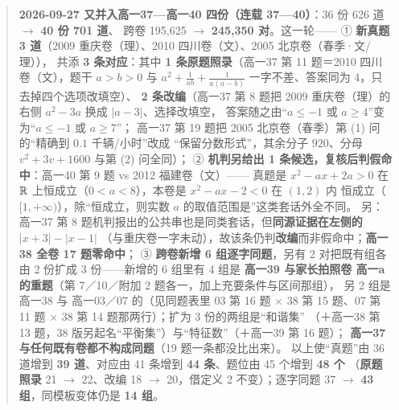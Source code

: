 \documentclass[a4paper,11pt]{article}
\begin{document}
\begin{quote}
\textbf{2026-09-27 又并入高一37---高一40 四份（连载 37---40）}：36 份 626 道 $\to$ \textbf{40 份 701 道}、
跨卷 195,625 $\to$ \textbf{245,350 对}。这一轮------
① \textbf{新真题 3 道}（2009 重庆卷（理）、2010 四川卷（文）、2005 北京卷（春季·文/理）），
共添 \textbf{3 条对应}：其中 \textbf{1 条原题照录}（高一37 第 11 题＝2010 四川卷（文），题干
\(a>b>0\) 与 \(a^2+\frac1{ab}+\frac1{a(a-b)}\) 一字不差、答案同为 \(4\)，只去掉四个选项改填空）、
\textbf{2 条改编}（高一37 第 8 题把 2009 重庆卷（理）的右侧 \(a^2-3a\) 换成 \(\lvert a-3\rvert\)、选择改填空，
答案随之由``\(a\leqslant-1\) 或 \(a\geqslant4\)''变为``\(a\leqslant-1\) 或 \(a\geqslant7\)''；
高一37 第 19 题把 2005 北京卷（春季）第 (1) 问的``精确到 \(0.1\) 千辆/小时''改成
``保留分数形式''，其余分子 \(920\)、分母 \(v^2+3v+1600\) 与第 (2) 问全同）；
② \textbf{机判另给出 1 条候选，复核后判假命中}：高一40 第 9 题 vs 2012 福建卷（文）------
真题是 \(x^2-ax+2a>0\) 在 \(\mathbb{R}\) 上恒成立（\(0<a<8\)），本卷是 \(x^2-ax-2<0\) 在 \((1,2)\) 内
恒成立（\([1,+\infty)\)），除``恒成立，则实数 \(a\) 的取值范围是''这类套话外全不同。
另：高一37 第 8 题机判报出的公共串也是同类套话，但\textbf{同源证据在左侧的 \(\lvert x+3\rvert-\lvert x-1\rvert\)}
（与重庆卷一字未动），故该条仍判\textbf{改编}而非假命中；\textbf{高一38 全卷 17 题零命中}；
③ \textbf{跨卷新增 6 组逐字同题}，另有 2 对把既有组各由 2 份扩成 3 份------新增的 6 组里有 4 组是
\textbf{高一39 与家长拍照卷 高一a 的重题}（第 7／10／附加 2 题各一，加上充要条件与区间那组），
另 2 组是 高一38 与 高一03／07 的（见同题表里 03 第 16 题 $\times$ 38 第 15 题、07 第 11 题 $\times$ 38 第 14 题那两行）；扩为 3 份的两组是``和谐集''
（＋高一38 第 13 题，38 版另起名``平衡集''）与``特征数''（＋高一39 第 16 题）；
\textbf{高一37 与任何既有卷都不构成同题}（19 题一条都没比出来）。
以上使``真题''由 36 道增到 \textbf{39 道}、对应由 41 条增到 \textbf{44 条}、题位由 45 个增到 \textbf{48 个}
（\textbf{原题照录} 21 $\to$ 22、改编 18 $\to$ 20，借定义 2 不变）；逐字同题 37 $\to$ \textbf{43 组}，同模板变体仍是 \textbf{14 组}。


\end{quote}
\end{document}
